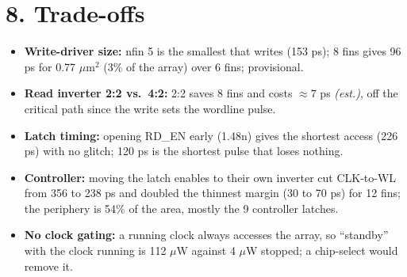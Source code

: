 \documentclass[10pt,letterpaper]{article}
\newcommand{\est}{\textit{(est.)}}
\begin{document}
\section*{8. Trade-offs}
\begin{itemize}\setlength{\itemsep}{0pt}\setlength{\topsep}{0pt}
\item \textbf{Write-driver size:} nfin 5 is the smallest that writes (153 ps); 8 fins gives 96 ps for 0.77 $\mu$m$^2$ (3\% of the array) over 6 fins; provisional.
\item \textbf{Read inverter 2:2 vs.\ 4:2:} 2:2 saves 8 fins and costs $\approx7$ ps \est, off the critical path since the write sets the wordline pulse.
\item \textbf{Latch timing:} opening RD\_EN early (1.48n) gives the shortest access (226 ps) with no glitch; 120 ps is the shortest pulse that loses nothing.
\item \textbf{Controller:} moving the latch enables to their own inverter cut CLK-to-WL from 356 to 238 ps and doubled the thinnest margin (30 to 70 ps) for 12 fins; the periphery is 54\% of the area, mostly the 9 controller latches.
\item \textbf{No clock gating:} a running clock always accesses the array, so ``standby'' with the clock running is 112 $\mu$W against 4 $\mu$W stopped; a chip-select would remove it.
\end{itemize}
\end{document}
